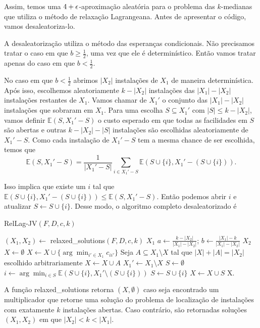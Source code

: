 Assim, temos uma $4 +\epsilon$-aproximação aleatória para o problema das $k$-medianas que utiliza o método de relaxação Lagrangeana. Antes de apresentar o código, vamos desaleatoriza-lo.

A desaleatorização utiliza o método das esperanças condicionais. Não precisamos tratar o caso em que $b \geq \frac{1}{2}$, uma vez que ele é determinístico. Então vamos tratar apenas do caso em que $b < \frac{1}{2}$.

No caso em que $b < \frac{1}{2}$ abrimos $|X_2|$ instalações de $X_1$ de maneira determinística. Após isso, escolhemos aleatoriamente $k - |X_2|$ instalações das $|X_1| - |X_2|$ instalações restantes de $X_1$. Vamos chamar de $X_1'$ o conjunto das $|X_1| - |X_2|$ instalações que sobraram em $X_1$. Para uma escolha $S \subseteq X_1'$ com $|S| \leq k - |X_2|$, vamos definir $\mathbb{E}(S,X_1' - S)$ o custo esperado em que todas as facilidades em $S$ são abertas e outras $k - |X_2| - |S|$ instalações são escolhidas aleatoriamente de $X_1' - S$. Como cada instalação de $X_1' - S$ tem a mesma chance de ser escolhida, temos que 
\[ \mathbb{E}(S,X_1' - S) = \frac{1}{|X_1' - S|}\sum_{i \in X_1' - S} \mathbb{E}(S \cup \{i\}, X_1' - \left( S \cup \{i\}\right)).\]

Isso implica que existe um $i$ tal que $\mathbb{E}(S \cup \{i\}, X_1' - (S \cup \{i\})) \leq \mathbb{E}(S,X_1' - S)$. Então podemos abrir $i$ e atualizar $S \gets S \cup \{i\}$. Desse modo, o algoritmo completo desaleatorizado é

\begin{algorithm}
    \caption{\sc RelLag-JV$(F,D,c,k)$}
    \begin{algorithmic}[1]
        \State $(X_1,X_2) \gets$ {\sc relaxed\_solutions}$(F,D,c,k)$
        \State \Return $X_1$
        \EndIf
        \State $a \gets \frac{k-|X_2|}{|X_1| - |X_2|}$; $b \gets \frac{|X_1| - k}{|X_1| - |X_2|}$
        \State \Return $X_2$
        \EndIf
        \State $X \gets \emptyset$
        \State $X \gets X \cup \{\arg\min_{i' \in X_1} c_{ii'}\}$
        \EndFor
        \State Seja $ A \subseteq X_1\setminus X$ tal que $|X| + |A| = |X_2|$ escolhido arbitrariamente
        \State $X \gets X \cup A$
        \EndIf
        \State $X_1' \gets X_1 \setminus X$
        \State $S \gets \emptyset$
        \State $i \gets \arg\min_{i\in S} \mathbb{E}(S \cup \{i\}, X_1' \setminus \left( S \cup \{i\}\right))$
        \State $S \gets S \cup \{i\}$
        \EndWhile
        \State $X \gets X \cup S$
        \State \Return X.
    \end{algorithmic}
\end{algorithm}
A função {\sc relaxed\_solutions} retorna $(X,\emptyset)$ caso seja encontrado um multiplicador que retorne uma solução do problema de localização de instalações com exatamente $k$ instalações abertas. Caso contrário, são retornadas soluções $(X_1,X_2)$ em que $|X_2| < k < |X_1|$.

